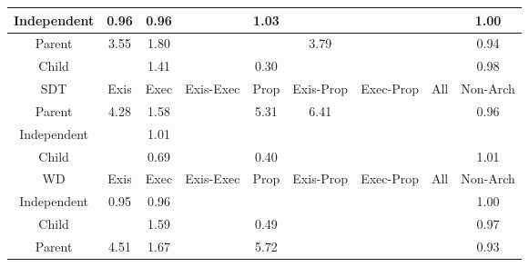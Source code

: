 \begin{tabular}{|c||c|c|c|c|c|c|c|c|}
\hline
Independent & \cellcolor[rgb]{0.9029207877891123,0.8064917288684649,0.41339273526983816} 0.96 & \cellcolor[rgb]{0.9032280854509933,0.8079462711347019,0.4136795464209271} 0.96 &  & \cellcolor[rgb]{0.909357626279173,0.8396957177111872,0.42} 1.03 &  &  &  & \cellcolor[rgb]{0.9099648929955535,0.8399833703663148,0.42} 1.00 \\ 
\hline
Parent & \cellcolor[rgb]{0.8591197284367414,0.8158988187331933,0.42} 3.55 & \cellcolor[rgb]{0.8939532076400322,0.8323988878294889,0.42} 1.80 &  &  & \cellcolor[rgb]{0.8543923213144566,0.8136595206226374,0.42} 3.79 &  &  & \cellcolor[rgb]{0.8993387468083544,0.789536734892877,0.41004949702113064} 0.94 \\ 
\hline
Child &  & \cellcolor[rgb]{0.9017230104848919,0.8360793207560014,0.42} 1.41 &  & \cellcolor[rgb]{0.7789195218939527,0.21955240363137607,0.29765822043435586} 0.30 &  &  &  & \cellcolor[rgb]{0.9071381114318121,0.8264537274439103,0.4173289040030246} 0.98 \\ 
\hline
\hline
SDT & Exis & Exec & Exis-Exec & Prop & Exis-Prop & Exec-Prop & All & Non-Arch \\ 
\hline
Parent & \cellcolor[rgb]{0.8446386595850119,0.8090393650665846,0.42000000000000004} 4.28 & \cellcolor[rgb]{0.898347267159408,0.8344802844439301,0.42} 1.58 &  & \cellcolor[rgb]{0.8240252904189111,0.7992751375668526,0.42} 5.31 & \cellcolor[rgb]{0.8020496747444714,0.7888656354052759,0.42} 6.41 &  &  & \cellcolor[rgb]{0.9033338410031724,0.8084468474150155,0.41377825160296083} 0.96 \\ 
\hline
Independent &  & \cellcolor[rgb]{0.9098033975842337,0.8399068725399,0.42} 1.01 &  &  &  &  &  &  \\ 
\hline
Child &  & \cellcolor[rgb]{0.8520946048393168,0.5659144629060993,0.3659549645166956} 0.69 &  & \cellcolor[rgb]{0.798759448248656,0.3134613883769718,0.316175485032079} 0.40 &  &  &  & \cellcolor[rgb]{0.909772852851917,0.839892403982487,0.42} 1.01 \\ 
\hline
\hline
WD & Exis & Exec & Exis-Exec & Prop & Exis-Prop & Exec-Prop & All & Non-Arch \\ 
\hline
Independent & \cellcolor[rgb]{0.9013259870524599,0.7989430053816431,0.41190425458229585} 0.95 & \cellcolor[rgb]{0.9032724436606242,0.8081562333269546,0.4137209474165826} 0.96 &  &  &  &  &  & \cellcolor[rgb]{0.9099554901824998,0.8399789164022365,0.42} 1.00 \\ 
\hline
Child &  & \cellcolor[rgb]{0.8982501703199389,0.8344342912041816,0.42} 1.59 &  & \cellcolor[rgb]{0.8154673486474913,0.3925454502647919,0.33176952540432514} 0.49 &  &  &  & \cellcolor[rgb]{0.9040989573816731,0.8120683982732524,0.4144923602228948} 0.97 \\ 
\hline
Parent & \cellcolor[rgb]{0.839873607121581,0.8067822349523279,0.42000000000000004} 4.51 & \cellcolor[rgb]{0.8966650940691379,0.8336834656116968,0.42} 1.67 &  & \cellcolor[rgb]{0.815873127252835,0.7954135865934481,0.42} 5.72 &  &  &  & \cellcolor[rgb]{0.8978545740466752,0.7825116504875961,0.40866426911023024} 0.93 \\ 
\hline
\end{tabular}